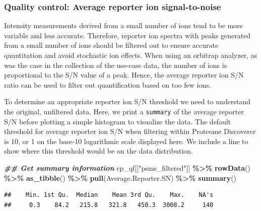 \documentclass[9pt,a4paper,]{extarticle}
\newenvironment{Shaded}{\begin{snugshade}}{\end{snugshade}}
\newcommand{\DocumentationTok}[1]{\textcolor[rgb]{0.56,0.35,0.01}{\textbf{\textit{#1}}}}
\newcommand{\FunctionTok}[1]{\textcolor[rgb]{0.13,0.29,0.53}{\textbf{#1}}}
\newcommand{\NormalTok}[1]{#1}
\newcommand{\SpecialCharTok}[1]{\textcolor[rgb]{0.81,0.36,0.00}{\textbf{#1}}}
\newcommand{\StringTok}[1]{\textcolor[rgb]{0.31,0.60,0.02}{#1}}
\begin{document}
\hypertarget{quality-control-average-reporter-ion-signal-to-noise}{%
\subsubsection{Quality control: Average reporter ion signal-to-noise}\label{quality-control-average-reporter-ion-signal-to-noise}}

Intensity measurements derived from a small number of ions tend to be more
variable and less accurate. Therefore, reporter ion spectra with peaks generated
from a small number of ions should be filtered out to ensure accurate
quantitation and avoid stochastic ion effects. When using an orbitrap analyzer,
as was the case in the collection of the use-case data, the number of ions is
proportional to the S/N value of a peak. Hence, the average reporter ion S/N
ratio can be used to filter out quantification based on too few ions.

To determine an appropriate reporter ion S/N threshold we need to understand the
original, unfiltered data. Here, we print a \texttt{summary} of the average reporter
S/N before plotting a simple histogram to visualize the data. The default
threshold for average reporter ion S/N when filtering within Proteome Discoverer
is 10, or 1 on the base-10 logarithmic scale displayed here. We include a line
to show where this threshold would be on the data distribution.

\begin{Shaded}
\begin{Highlighting}[]
\DocumentationTok{\#\# Get summary information}
\NormalTok{cp\_qf[[}\StringTok{"psms\_filtered"}\NormalTok{]] }\SpecialCharTok{\%\textgreater{}\%} 
  \FunctionTok{rowData}\NormalTok{() }\SpecialCharTok{\%\textgreater{}\%} 
  \FunctionTok{as\_tibble}\NormalTok{() }\SpecialCharTok{\%\textgreater{}\%} 
  \FunctionTok{pull}\NormalTok{(Average.Reporter.SN) }\SpecialCharTok{\%\textgreater{}\%} 
  \FunctionTok{summary}\NormalTok{()}
\end{Highlighting}
\end{Shaded}

\begin{verbatim}
##    Min. 1st Qu.  Median    Mean 3rd Qu.    Max.    NA's 
##     0.3    84.2   215.8   321.8   450.3  3008.2     140
\end{verbatim}
\end{document}
